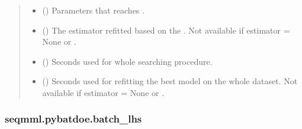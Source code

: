 \documentclass[letterpaper,10pt,english]{sphinxmanual}
\begin{document}
\begin{fulllineitems}
\begin{quote}
\begin{description}
\begin{itemize}
\item {} 
 () \textendash{} Parameters that reaches .

\item {} 
 () \textendash{} The estimator refitted based on the . 
Not available if estimator = None or .

\item {} 
 () \textendash{} Seconds used for whole searching procedure.

\item {} 
 () \textendash{} Seconds used for refitting the best model on the whole dataset.
Not available if estimator = None or .

\end{itemize}

\end{description}\end{quote}

\end{fulllineitems}



\subsubsection{seqmml.pybatdoe.batch\_lhs}
\label{\detokenize{apidoc:module-pybatdoe.batch_lhs}}\label{\detokenize{apidoc:seqmml-pybatdoe-batch-lhs}}
\end{document}
